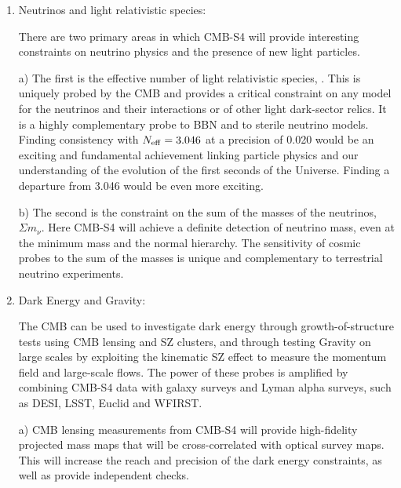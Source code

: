 \begin{enumerate}
\item{Neutrinos and light relativistic species:

There are two primary areas in which CMB-S4 will provide interesting constraints on neutrino physics and the presence of new light particles.


a) The first is the effective number of light relativistic species, \neff. This is uniquely probed by the CMB and provides a critical constraint on any model for the neutrinos and their interactions or of other light dark-sector relics. It is a highly complementary probe to BBN and to sterile neutrino models.  Finding consistency with $N_\mathrm{eff} = 3.046$ at a precision of 0.020 would be an exciting and fundamental achievement linking particle physics and our understanding of the evolution of the first seconds of the Universe. Finding a departure from 3.046 would be even more exciting. %

b) The second is the constraint on the sum of the masses of the neutrinos, $\Sigma m_\nu$. Here CMB-S4 will achieve %
a definite detection of neutrino mass, even at the minimum mass and the normal hierarchy. The sensitivity of cosmic probes to the sum of the masses is unique and complementary to terrestrial neutrino experiments.
 }

\item{Dark Energy and Gravity:

 The CMB can be used to investigate dark energy through growth-of-structure tests using CMB lensing and SZ clusters, and through testing Gravity on large scales by exploiting the kinematic SZ effect to measure the momentum field and large-scale flows. The power of these probes is amplified by combining CMB-S4 data with galaxy surveys and Lyman alpha surveys, such as DESI, LSST, Euclid and WFIRST.

 a) CMB lensing measurements from CMB-S4 will provide high-fidelity projected mass maps that will be cross-correlated with optical survey maps. This will increase the reach and precision of the dark energy constraints, as well as provide independent checks. %

}
\end{enumerate}
